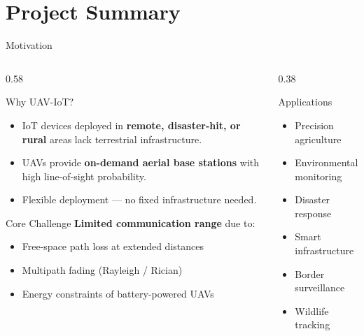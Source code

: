 \documentclass[aspectratio=169, 11pt]{beamer}
\begin{document}
\section{Project Summary}

\begin{frame}{Motivation}
\begin{columns}[T]
\begin{column}{0.58\textwidth}
\begin{block}{Why UAV-IoT?}
\begin{itemize}
  \item IoT devices deployed in \textbf{remote, disaster-hit, or rural} areas lack terrestrial infrastructure.
  \item UAVs provide \textbf{on-demand aerial base stations} with high line-of-sight probability.
  \item Flexible deployment --- no fixed infrastructure needed.
\end{itemize}
\end{block}
\vspace{0.2cm}
\begin{alertblock}{Core Challenge}
\textbf{Limited communication range} due to:
\begin{itemize}
  \item Free-space path loss at extended distances
  \item Multipath fading (Rayleigh / Rician)
  \item Energy constraints of battery-powered UAVs
\end{itemize}
\end{alertblock}
\end{column}
\begin{column}{0.38\textwidth}
\begin{exampleblock}{Applications}
\begin{itemize}
  \item Precision agriculture
  \item Environmental monitoring
  \item Disaster response
  \item Smart infrastructure
  \item Border surveillance
  \item Wildlife tracking
\end{itemize}
\end{exampleblock}
\end{column}
\end{columns}
\end{frame}
\end{document}
